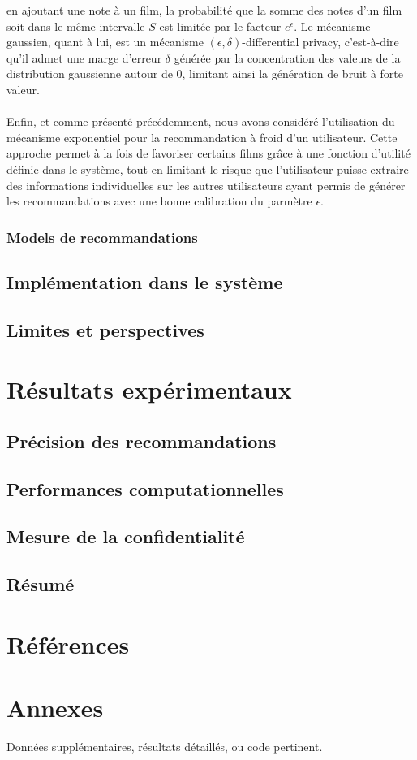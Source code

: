 \documentclass{article}
\begin{document}
en ajoutant une note à un film, la probabilité que la somme des notes d'un film soit dans le même intervalle $S$ est limitée par le facteur $e^{\epsilon}$.
Le mécanisme gaussien, quant à lui, est un mécanisme $(\epsilon,\delta)$-differential privacy, c'est-à-dire qu'il admet une marge d'erreur $\delta$ générée
par la concentration des valeurs de la distribution gaussienne autour de 0, limitant ainsi la génération de bruit à forte valeur.\\
$ $\\
Enfin, et comme présenté précédemment, nous avons considéré l'utilisation du mécanisme exponentiel pour la recommandation à froid d'un utilisateur.
Cette approche permet à la fois de favoriser certains films grâce à une fonction d'utilité définie dans le système, tout en limitant le risque que 
l'utilisateur puisse extraire des informations individuelles sur les autres utilisateurs ayant permis de générer les recommandations avec une bonne 
calibration du parmètre $\epsilon$.
\subsubsection{Models de recommandations}


\subsection{Implémentation dans le système}
\subsection{Limites et perspectives}


\section{Résultats expérimentaux}
\subsection{Précision des recommandations}
\subsection{Performances computationnelles}
\subsection{Mesure de la confidentialité}
\subsection{Résumé}

\section*{Références}

\appendix
\section*{Annexes}
Données supplémentaires, résultats détaillés, ou code pertinent.
\end{document}

